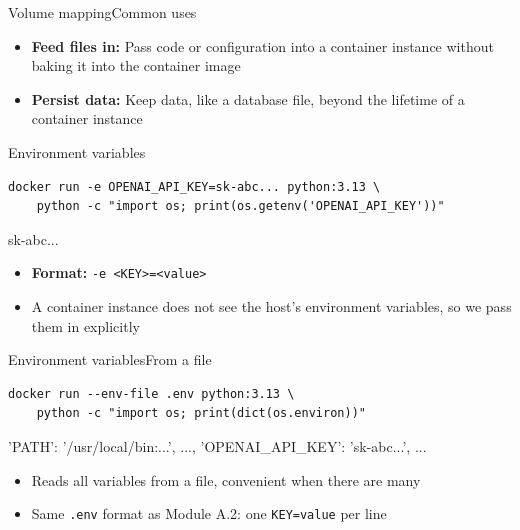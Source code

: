 \documentclass[aspectratio=169]{beamer}
\begin{document}
\begin{frame}{Volume mapping}{Common uses}
  \begin{itemize}
    \item \textbf{Feed files in:} Pass code or configuration into a container instance without baking it into the container image
    \item \textbf{Persist data:} Keep data, like a database file, beyond the lifetime of a container instance
  \end{itemize}

\note{
}
\end{frame}


\begin{frame}[fragile]{Environment variables}
  \begin{verbatim}
docker run -e OPENAI_API_KEY=sk-abc... python:3.13 \
    python -c "import os; print(os.getenv('OPENAI_API_KEY'))"
  \end{verbatim}
  \begin{cmdoutput}
sk-abc...
  \end{cmdoutput}

  \begin{itemize}
    \item \textbf{Format:} \texttt{-e <KEY>=<value>}
    \item A container instance does not see the host's environment variables, so we pass them in explicitly
  \end{itemize}

\note{
}
\end{frame}


\begin{frame}[fragile]{Environment variables}{From a file}
  \begin{verbatim}
docker run --env-file .env python:3.13 \
    python -c "import os; print(dict(os.environ))"
  \end{verbatim}
  \begin{cmdoutput}
{'PATH': '/usr/local/bin:...', ..., 'OPENAI_API_KEY': 'sk-abc...', ...}
  \end{cmdoutput}

  \begin{itemize}
    \item Reads all variables from a file, convenient when there are many
    \item Same \texttt{.env} format as Module A.2: one \texttt{KEY=value} per line
  \end{itemize}

\note{
}
\end{frame}
\end{document}

